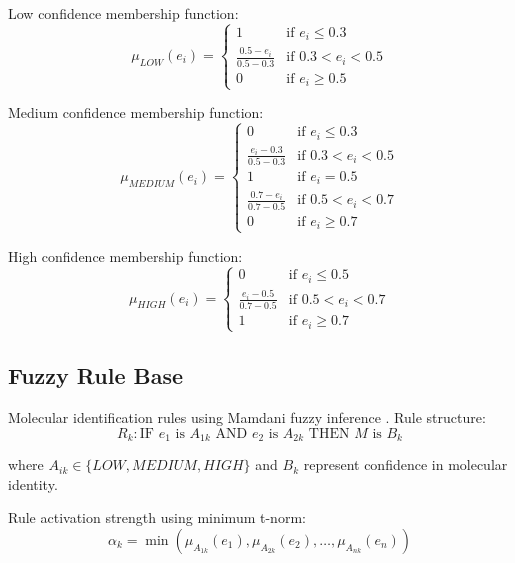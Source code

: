 \documentclass[12pt,a4paper]{article}
\begin{document}
Low confidence membership function:
\begin{equation}
\mu_{LOW}(e_i) = \begin{cases}
1 & \text{if } e_i \leq 0.3 \\
\frac{0.5 - e_i}{0.5 - 0.3} & \text{if } 0.3 < e_i < 0.5 \\
0 & \text{if } e_i \geq 0.5
\end{cases}
\end{equation}

Medium confidence membership function:
\begin{equation}
\mu_{MEDIUM}(e_i) = \begin{cases}
0 & \text{if } e_i \leq 0.3 \\
\frac{e_i - 0.3}{0.5 - 0.3} & \text{if } 0.3 < e_i < 0.5 \\
1 & \text{if } e_i = 0.5 \\
\frac{0.7 - e_i}{0.7 - 0.5} & \text{if } 0.5 < e_i < 0.7 \\
0 & \text{if } e_i \geq 0.7
\end{cases}
\end{equation}

High confidence membership function:
\begin{equation}
\mu_{HIGH}(e_i) = \begin{cases}
0 & \text{if } e_i \leq 0.5 \\
\frac{e_i - 0.5}{0.7 - 0.5} & \text{if } 0.5 < e_i < 0.7 \\
1 & \text{if } e_i \geq 0.7
\end{cases}
\end{equation}

\subsection{Fuzzy Rule Base}

Molecular identification rules using Mamdani fuzzy inference \cite{mamdani1975experiment}. Rule structure:
\begin{equation}
R_k: \text{IF } e_1 \text{ is } A_{1k} \text{ AND } e_2 \text{ is } A_{2k} \text{ THEN } M \text{ is } B_k
\end{equation}

where $A_{ik} \in \{LOW, MEDIUM, HIGH\}$ and $B_k$ represent confidence in molecular identity.

Rule activation strength using minimum t-norm:
\begin{equation}
\alpha_k = \min(\mu_{A_{1k}}(e_1), \mu_{A_{2k}}(e_2), \ldots, \mu_{A_{nk}}(e_n))
\end{equation}
\end{document}
